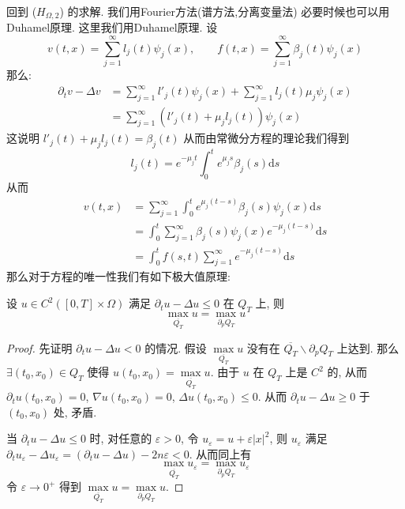 \documentclass[11pt]{ctexart}[UTF8]
\begin{document}
回到 ($H_{\Omega,2}$) 的求解. 我们用Fourier方法(谱方法,分离变量法) 必要时候也可以用Duhamel原理. 这里我们用Duhamel原理. 设
\begin{equation*}
    v(t,x) = \sum_{j=1}^{\infty}l_{j}(t) \psi_j(x),\quad\quad f(t,x) = \sum_{j=1}^{\infty} \beta_j(t) \psi_j(x)
\end{equation*}
那么:
\begin{equation*}
    \begin{aligned}
        \partial_{t} v - \Delta v &= \sum_{j=1}^{\infty} l'_{j}(t) \psi_j(x) + \sum_{j=1}^{\infty} l_j(t) \mu_j \psi_j(x)\\
                                  &= \sum_{j=1}^{\infty} (l'_{j}(t) + \mu_j l_j(t)) \psi_j(x)
    \end{aligned}
\end{equation*}
这说明 $l'_{j}(t) + \mu_j l_j(t) = \beta_j(t)$ 从而由常微分方程的理论我们得到
\begin{equation*}
    l_j(t) = e^{-\mu_j t} \int_{0}^{t} e^{\mu_j s} \beta_j(s) \mathrm{d}s
\end{equation*}
从而
\begin{equation*}
    \begin{aligned}
        v(t,x) &= \sum_{j=1}^{\infty} \int_{0}^{t} e^{\mu_j (t-s)} \beta_j(s)\psi_j(x) \mathrm{d}s \\
                &= \int_{0}^{t} \sum_{j=1}^{\infty}\beta_{j}(s)\psi_j(x) e^{-\mu_j (t-s)}   \mathrm{d}s\\
                &= \int_{0}^{t} f(s,t)\sum_{j=1}^{\infty} e^{-\mu_j (t-s)} \mathrm{d}s
    \end{aligned}
\end{equation*}
那么对于方程的唯一性我们有如下极大值原理:
\begin{theorem}
    设 $u \in C^{2}\left( [0,T]\times \Omega \right)$ 满足 $\partial_{t} u - \Delta u \leq 0$ 在 $Q_{T}$ 上, 则
    \begin{equation*}
        \max\limits_{\overline{Q_{T}}} u = \max\limits_{\partial_{p} Q_{T}} u
    \end{equation*}
\end{theorem}
\begin{proof}
    先证明 $\partial_{t} u - \Delta u < 0$ 的情况. 假设 $\max\limits_{\overline{Q_{T}}} u$ 没有在 $\overline{Q_{T}}\backslash\partial_p Q_T$ 上达到.
    那么 $\exists (t_0,x_0) \in Q_T$ 使得 $u(t_0,x_0) = \max\limits_{\overline{Q_{T}}} u$. 由于 $u$ 在 $Q_T$ 上是 $C^2$ 的, 
    从而 $\partial_{t} u(t_0,x_0) = 0$, $\nabla u(t_0,x_0) = 0$, $\Delta u(t_0,x_0) \leq 0$. 从而 $\partial_{t} u - \Delta u \geq 0$ 于 $(t_0,x_0)$ 处, 矛盾.\par
    当 $\partial_{t} u - \Delta u \leq 0$ 时, 对任意的 $\varepsilon > 0$, 令 $u_\varepsilon = u + \varepsilon |x|^{2}$, 
    则 $u_\varepsilon$ 满足 $\partial_{t} u_\varepsilon - \Delta u_\varepsilon = (\partial_{t} u - \Delta u) - 2n\varepsilon < 0$. 从而同上有
    \begin{equation*}
        \max\limits_{\overline{Q_{T}}} u_\varepsilon = \max\limits_{\partial_{p} Q_{T}} u_\varepsilon
    \end{equation*}
    令 $\varepsilon \to 0^+$ 得到 $\max\limits_{\overline{Q_{T}}} u = \max\limits_{\partial_{p} Q_{T}} u$.
\end{proof}
\end{document}
